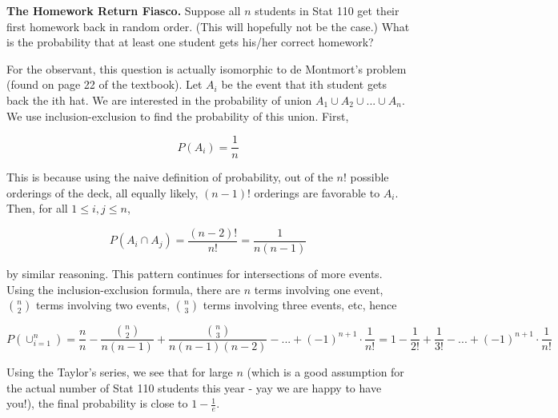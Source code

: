 \documentclass[11pt]{article}
\begin{document}
\begin{exercise}
\textbf{The Homework Return Fiasco.} Suppose all $n$ students in Stat 110 get their first homework back in random order. (This will hopefully not be the case.) What is the probability that at least one student gets his/her correct homework?
\end{exercise}
\begin{solution}
For the observant, this question is actually isomorphic to de Montmort's problem (found on page 22 of the textbook). Let $A_i$ be the event that ith student gets back the ith hat. We are interested in the probability of union $A_1 \cup A_2 \cup ... \cup A_n$. We use inclusion-exclusion to find the probability of this union. First,

$$P(A_i) = \frac{1}{n}$$

This is because using the naive definition of probability, out of the $n!$ possible orderings of the deck, all equally likely, $(n-1)!$ orderings are favorable to $A_i$. Then, for all $1 \le i,j \le n$,

$$P(A_i \cap A_j) = \frac{(n-2)!}{n!} = \frac{1}{n(n-1)}$$

by similar reasoning. This pattern continues for intersections of more events. Using the inclusion-exclusion formula, there are $n$ terms involving one event, $\binom{n}{2}$ terms involving two events, $\binom{n}{3}$ terms involving three events, etc, hence

$$P(\cup_{i=1}^{n}) = \frac{n}{n} - \frac{\binom{n}{2}}{n(n-1)} + \frac{\binom{n}{3}}{n(n-1)(n-2)} - ... + (-1)^{n+1} \cdot \frac{1}{n!} = 1 - \frac{1}{2!} + \frac{1}{3!} - ... + (-1)^{n+1} \cdot \frac{1}{n!}$$

Using the Taylor's series, we see that for large $n$ (which is a good assumption for the actual number of Stat 110 students this year - yay we are happy to have you!), the final probability is close to $1 - \frac{1}{e}$.

\end{solution}
\end{document}
